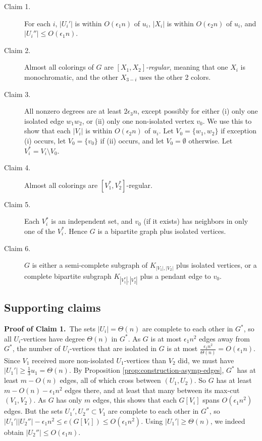 \documentclass[11pt]{article}
\begin{document}
\begin{description}

\item[Claim 1.] For each $i$, $|U_i'|$ is within $O(\epsilon_1 n)$ of
  $u_i$, $|X_i|$ is within $O(\epsilon_2 n)$ of $u_i$, and
  $|U_i''| \leq O(\epsilon_1 n)$.

\item[Claim 2.] Almost all colorings of $G$ are \emph{$[X_1,
    X_2]$-regular}, meaning that one $X_i$ is monochromatic, and the
  other $X_{3-i}$ uses the other 2 colors.

\item[Claim 3.] All nonzero degrees are at least $2 \epsilon_3 n$,
  except possibly for either (i) only one isolated edge $w_1 w_2$, or
  (ii) only one non-isolated vertex $v_0$.  We use this to show that
  each $|V_i|$ is within $O(\epsilon_2 n)$ of $u_i$.  Let $V_0 =
  \{w_1, w_2\}$ if exception (i) occurs, let $V_0 = \{v_0\}$ if (ii)
  occurs, and let $V_0 = \emptyset$ otherwise.  Let $V_i^* = V_i
  \setminus V_0$.

\item[Claim 4.]  Almost all colorings are $[V_1^*, V_2^*]$-regular.

\item[Claim 5.] Each $V_i^*$ is an independent set, and $v_0$ (if it
  exists) has neighbors in only one of the $V_i^*$.  Hence $G$ is a
  bipartite graph plus isolated vertices.

\item[Claim 6.] $G$ is either a semi-complete subgraph of $K_{|V_1|,
    |V_2|}$ plus isolated vertices, or a complete bipartite subgraph
  $K_{|V_1^*|, |V_2^*|}$ plus a pendant edge to $v_0$.

\end{description}


\subsection{Supporting claims}


\noindent \textbf{Proof of Claim 1.}\, The sets $|U_i| = \Theta(n)$
are complete to each other in $G^*$, so all $U_i$-vertices have degree
$\Theta(n)$ in $G^*$.  As $G$ is at most $\epsilon_1 n^2$ edges away
from $G^*$, the number of $U_i$-vertices that are isolated in $G$ is
at most $\frac{\epsilon_1 n^2}{\Theta(n)} = O(\epsilon_1 n)$.  Since
$V_1$ received more non-isolated $U_1$-vertices than $V_2$ did, we
must have $|U_1'| \geq \frac{1}{3} u_1 = \Theta(n)$.  By Proposition
\ref{prop:construction-asymp-edges}, $G^*$ has at least $m - O(n)$
edges, all of which cross between $(U_1, U_2)$.  So $G$ has at least
$m - O(n)-\epsilon_1 n^2$ edges there, and at least that many between
its max-cut $(V_1, V_2)$.  As $G$ has only $m$ edges, this shows that
each $G[V_i]$ spans $O(\epsilon_1 n^2)$ edges.  But the sets $U_1',
U_2'' \subset V_1$ are complete to each other in $G^*$, so $|U_1'|
|U_2''| - \epsilon_1 n^2 \leq e(G[V_i]) \leq O(\epsilon_1 n^2)$.
Using $|U_1'| \geq \Theta(n)$, we indeed obtain $|U_2''| \leq
O(\epsilon_1 n)$.
\end{document}
